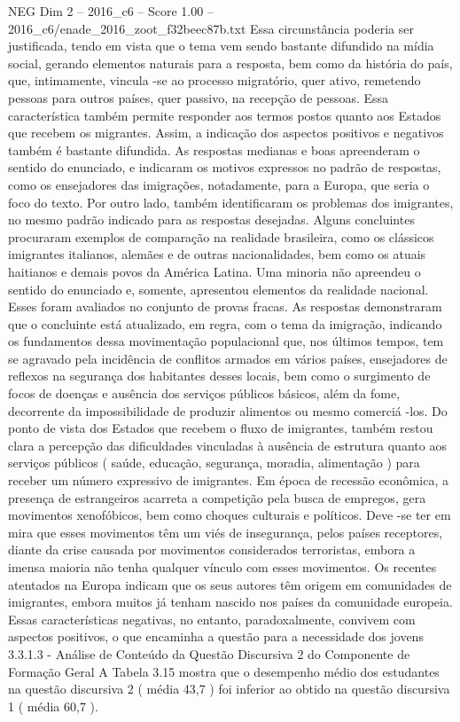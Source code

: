 \begin{textsample}{NEG Dim 2 – 2016\_c6 – Score 1.00 – 2016\_c6/enade\_2016\_zoot\_f32beec87b.txt}
Essa circunstância poderia ser justificada, tendo em vista que o tema vem sendo bastante difundido na mídia social, gerando elementos naturais para a resposta, bem como da história do país, que, intimamente, vincula -se ao processo migratório, quer ativo, remetendo pessoas para outros países, quer passivo, na recepção de pessoas.
Essa característica também permite responder aos termos postos quanto aos Estados que recebem os migrantes.
Assim, a indicação dos aspectos positivos e negativos também é bastante difundida.
As respostas medianas e boas apreenderam o sentido do enunciado, e indicaram os motivos expressos no padrão de respostas, como os ensejadores das imigrações, notadamente, para a Europa, que seria o foco do texto.
Por outro lado, também identificaram os problemas dos imigrantes, no mesmo padrão indicado para as respostas desejadas.
Alguns concluintes procuraram exemplos de comparação na realidade brasileira, como os clássicos imigrantes italianos, alemães e de outras nacionalidades, bem como os atuais haitianos e demais povos da América Latina.
Uma minoria não apreendeu o sentido do enunciado e, somente, apresentou elementos da realidade nacional.
Esses foram avaliados no conjunto de provas fracas.
As respostas demonstraram que o concluinte está atualizado, em regra, com o tema da imigração, indicando os fundamentos dessa movimentação populacional que, nos últimos tempos, tem se agravado pela incidência de conflitos armados em vários países, ensejadores de reflexos na segurança dos habitantes desses locais, bem como o surgimento de focos de doenças e ausência dos serviços públicos básicos, além da fome, decorrente da impossibilidade de produzir alimentos ou mesmo comerciá -los.
Do ponto de vista dos Estados que recebem o fluxo de imigrantes, também restou clara a percepção das dificuldades vinculadas à ausência de estrutura quanto aos serviços públicos ( saúde, educação, segurança, moradia, alimentação ) para receber um número expressivo de imigrantes.
Em época de recessão econômica, a presença de estrangeiros acarreta a competição pela busca de empregos, gera movimentos xenofóbicos, bem como choques culturais e políticos.
Deve -se ter em mira que esses movimentos têm um viés de insegurança, pelos países receptores, diante da crise causada por movimentos considerados terroristas, embora a imensa maioria não tenha qualquer vínculo com esses movimentos.
Os recentes atentados na Europa indicam que os seus autores têm origem em comunidades de imigrantes, embora muitos já tenham nascido nos países da comunidade europeia.
Essas características negativas, no entanto, paradoxalmente, convivem com aspectos positivos, o que encaminha a questão para a necessidade dos jovens 3.3.1.3 - Análise de Conteúdo da Questão Discursiva 2 do Componente de Formação Geral A Tabela 3.15 mostra que o desempenho médio dos estudantes na questão discursiva 2 ( média 43,7 ) foi inferior ao obtido na questão discursiva 1 ( média 60,7 ).

\end{textsample}
